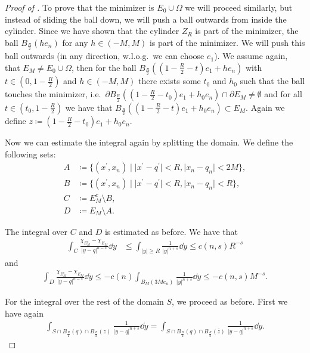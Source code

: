 \begin{proof}[Proof of ]
	To prove that the minimizer is \( E_0 \cup \Omega \) we will proceed similarly, but
	instead of sliding the ball down, we will push a ball outwards from inside the cylinder. Since we
	have shown that the cylinder \( Z_R \) is part of the minimizer, the ball \( B_{\frac{R}{2}} (h
	e_n) \) for any \( h \in (- M, M) \) is part of the minimizer. We will push this ball outwards (in
	any direction, w.l.o.g.\ we can choose \( e_1 \)). We assume again, that \( E_M \neq E_0 \cup
	\Omega \), then for the ball \( B_{\frac{R}{2}} ((1 - \frac{R}{2} - t)e_1 + he_n) \) with \( t \in
	(0, 1 - \frac{R}{2}) \) and \( h \in (- M, M) \) there exists some \( t_0 \) and \( h_0 \) such
	that the ball touches the minimizer, i.e.\ \( \partial B_{\frac{R}{2}} ((1 - \frac{R}{2} - t_0)e_1 +
	h_0 e_n)\cap \partial E_M \neq \emptyset \) and for all \( t \in (t_0, 1 - \frac{R}{2}) \) we have
	that \( B_{\frac{R}{2}} ((1 - \frac{R}{2} - t)e_1 + h_0 e_n) \subset E_M \). Again we define \( z
	\coloneqq (1 - \frac{R}{2} - t_0)e_1 + h_0 e_n \).

	Now we can estimate the integral again by splitting the domain. We define the following sets:
	\begin{align*}
		A & \coloneqq \{(x^\prime, x_n) \mid \lvert x^\prime - q^\prime \rvert < R, \lvert x_n - q_n \rvert < 2M \}, \\
		B & \coloneqq \{(x^\prime, x_n) \mid \lvert x^\prime - q^\prime \rvert < R, \lvert x_n - q_n \rvert < R \}, \\
		C & \coloneqq E_M^c \setminus B, \\
		D & \coloneqq E_M \setminus A.
	\end{align*}

	The integral over \( C \) and \( D \) is estimated as before. We have that
	\begin{align*}
		\int_C \frac{\chi_{E_M^c} - \chi_{E_M}}{\lvert y - q \rvert^{n - s}} \dd{y}
		 & \leq \int_{\lvert y \rvert \geq R} \frac{1}{\lvert y \rvert^{n + s}} \dd{y} \leq c(n, s) R^{- s}
	\end{align*}
	and
	\begin{align*}
		\int_D \frac{\chi_{E_M^c} - \chi_{E_M}}{\lvert y - q \rvert^{n - s}} \dd{y}
		\leq - c(n) \int_{B_M (3Me_n)} \frac{1}{\lvert y \rvert^{n + s}} \dd{y} \leq - c(n, s) M^{- s}.
	\end{align*}

	For the integral over the rest of the domain \( S \), we proceed as before. First we have again
	\begin{gather*}
		\int_{S\cap B_{\frac{R}{2}} (q) \cap B_{\frac{R}{2}} (z)} \frac{1}{\lvert y-q \rvert^{n + s}}\dd{y} = \int_{S\cap B_{\frac{R}{2}} (q) \cap B_{\frac{R}{2}} (\bar{z})} \frac{1}{\lvert y-q \rvert^{n + s}}\dd{y}.
	\end{gather*}


\end{proof}
